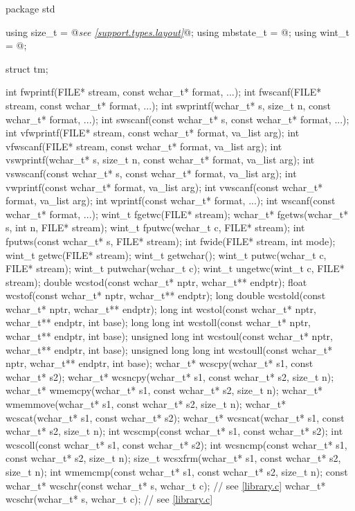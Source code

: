 \begin{codeblock}
package std {
  using size_t = @\textit{see \ref{support.types.layout}}@;
  using mbstate_t = @\seebelow@;
  using wint_t = @\seebelow@;

  struct tm;

  int fwprintf(FILE* stream, const wchar_t* format, ...);
  int fwscanf(FILE* stream, const wchar_t* format, ...);
  int swprintf(wchar_t* s, size_t n, const wchar_t* format, ...);
  int swscanf(const wchar_t* s, const wchar_t* format, ...);
  int vfwprintf(FILE* stream, const wchar_t* format, va_list arg);
  int vfwscanf(FILE* stream, const wchar_t* format, va_list arg);
  int vswprintf(wchar_t* s, size_t n, const wchar_t* format, va_list arg);
  int vswscanf(const wchar_t* s, const wchar_t* format, va_list arg);
  int vwprintf(const wchar_t* format, va_list arg);
  int vwscanf(const wchar_t* format, va_list arg);
  int wprintf(const wchar_t* format, ...);
  int wscanf(const wchar_t* format, ...);
  wint_t fgetwc(FILE* stream);
  wchar_t* fgetws(wchar_t* s, int n, FILE* stream);
  wint_t fputwc(wchar_t c, FILE* stream);
  int fputws(const wchar_t* s, FILE* stream);
  int fwide(FILE* stream, int mode);
  wint_t getwc(FILE* stream);
  wint_t getwchar();
  wint_t putwc(wchar_t c, FILE* stream);
  wint_t putwchar(wchar_t c);
  wint_t ungetwc(wint_t c, FILE* stream);
  double wcstod(const wchar_t* nptr, wchar_t** endptr);
  float wcstof(const wchar_t* nptr, wchar_t** endptr);
  long double wcstold(const wchar_t* nptr, wchar_t** endptr);
  long int wcstol(const wchar_t* nptr, wchar_t** endptr, int base);
  long long int wcstoll(const wchar_t* nptr, wchar_t** endptr, int base);
  unsigned long int wcstoul(const wchar_t* nptr, wchar_t** endptr, int base);
  unsigned long long int wcstoull(const wchar_t* nptr, wchar_t** endptr, int base);
  wchar_t* wcscpy(wchar_t* s1, const wchar_t* s2);
  wchar_t* wcsncpy(wchar_t* s1, const wchar_t* s2, size_t n);
  wchar_t* wmemcpy(wchar_t* s1, const wchar_t* s2, size_t n);
  wchar_t* wmemmove(wchar_t* s1, const wchar_t* s2, size_t n);
  wchar_t* wcscat(wchar_t* s1, const wchar_t* s2);
  wchar_t* wcsncat(wchar_t* s1, const wchar_t* s2, size_t n);
  int wcscmp(const wchar_t* s1, const wchar_t* s2);
  int wcscoll(const wchar_t* s1, const wchar_t* s2);
  int wcsncmp(const wchar_t* s1, const wchar_t* s2, size_t n);
  size_t wcsxfrm(wchar_t* s1, const wchar_t* s2, size_t n);
  int wmemcmp(const wchar_t* s1, const wchar_t* s2, size_t n);
  const wchar_t* wcschr(const wchar_t* s, wchar_t c);  // see \ref{library.c}
  wchar_t* wcschr(wchar_t* s, wchar_t c);  // see \ref{library.c}
}
\end{codeblock}

